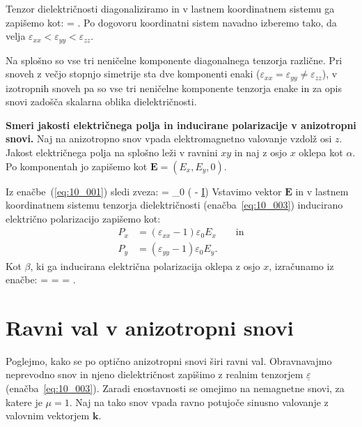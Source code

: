 Tenzor dielektričnosti diagonaliziramo in v lastnem koordinatnem 
sistemu ga zapišemo kot:
\beq
\underline{\varepsilon} = 
\!\!.
\label{eq:10_003}
\eeq
Po dogovoru koordinatni sistem navadno izberemo tako, da velja 
$\varepsilon_{xx}<\varepsilon_{yy}<\varepsilon_{zz}$.

Na splošno so vse tri neničelne komponente diagonalnega tenzorja različne. 
Pri snoveh z večjo stopnjo simetrije sta dve komponenti enaki ($\varepsilon_{xx} = 
\varepsilon_{yy} \neq \varepsilon_{zz}$), v izotropnih snoveh pa so vse tri 
neničelne komponente tenzorja enake in za opis snovi zadošča skalarna oblika dielektričnosti.

\begin{example}{\bf Smeri jakosti električnega polja 
in inducirane polarizacije v anizotropni snovi.}
Naj na anizotropno snov vpada elektromagnetno valovanje vzdolž osi $z$. Jakost
električnega polja na splošno leži v ravnini $xy$ in naj z osjo $x$ oklepa kot $\alpha$. 
Po komponentah jo zapišemo kot $\mathbf{E} = (E_x, E_y, 0)$. 

Iz enačbe~(\ref{eq:10_001}) sledi zveza:
\beq
{} = \varepsilon_0 \left(\underline{\varepsilon} - \underline{I}\right)
\label{eq:10_004}
\eeq
Vstavimo vektor $\mathbf{E}$ in v lastnem koordinatnem sistemu tenzorja 
dielektričnosti (enačba~\ref{eq:10_003}) inducirano električno polarizacijo zapišemo kot:
\begin{align}
P_x &= (\varepsilon_{xx}-1) \varepsilon_0 E_x \qquad \mathrm{in} \label{eq:10_005}\\
P_y &= (\varepsilon_{yy}-1) \varepsilon_0 E_y.
\label{eq:10_006}
\end{align}
Kot $\beta$, ki ga inducirana električna polarizacija oklepa z osjo $x$, izračunamo iz enačbe:
\beq
\tan \beta =  = 
 = \tan \alpha.
\eeq
\end{example}

\section{Ravni val v anizotropni snovi}
Poglejmo, kako se po optično anizotropni snovi širi ravni val. 
Obravnavajmo neprevodno snov in njeno dielektričnost 
zapišimo z realnim tenzorjem $\underline{\varepsilon}$ (enačba~\ref{eq:10_003}). 
Zaradi enostavnosti se omejimo na nemagnetne snovi, za katere je $\mu = 1$. 
Naj na tako snov vpada ravno potujoče sinusno valovanje z 
valovnim vektorjem $\mathbf{k}$.  

